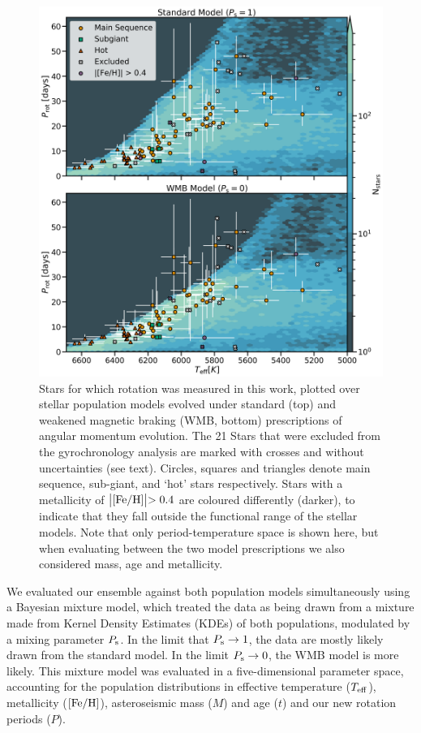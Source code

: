 \documentclass[12pt]{article}
\newcommand{\feh}{\mbox{$\rm{[Fe/H]}$}\xspace}
\begin{document}
\begin{figure}
	\centering
	\includegraphics[width=\textwidth]{fullsample.png}
	\caption{Stars for which rotation was measured in this work, plotted over stellar population models evolved under standard (top) and weakened magnetic braking (WMB, bottom) prescriptions of angular momentum evolution. The 21 Stars that were excluded from the gyrochronology analysis are marked with crosses and without uncertainties (see text). Circles, squares and triangles denote main sequence, sub-giant, and `hot' stars respectively. Stars with a metallicity of $\bigl\lvert \feh \bigl\rvert > 0.4$ are coloured differently (darker), to indicate that they fall outside the functional range of the \cite{vansaders+2019} stellar models. Note that only period-temperature space is shown here, but when evaluating between the two model prescriptions we also considered mass, age and metallicity.}
	\label{fig:fullsample}
\end{figure}

We evaluated our ensemble against both population models simultaneously using a Bayesian mixture model, which treated the data as being drawn from a mixture made from Kernel Density Estimates (KDEs) of both populations, modulated by a mixing parameter $P_{\rm s}$. In the limit that $P_{\rm s} \rightarrow 1$, the data are mostly likely drawn from the standard model. In the limit $P_{\rm s} \rightarrow 0$, the WMB model is more likely. This mixture model was evaluated in a five-dimensional parameter space, accounting for the population distributions in effective temperature ($T_{\rm eff}$), metallicity (\feh), asteroseismic mass ($M$) and age ($t$) and our new rotation periods ($P$).
\end{document}
